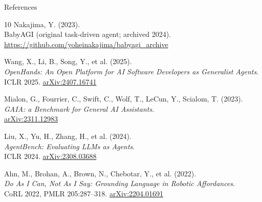 \begin{frame}[allowframebreaks]{References}
\begin{thebibliography}{10}
      Nakajima, Y. (2023). \\
      BabyAGI (original task-driven agent; archived 2024).\\
      \href{https://github.com/yoheinakajima/babyagi_archive}{https://github.com/yoheinakajima/babyagi\_archive}

      Wang, X., Li, B., Song, Y., et al. (2025). \\
      \emph{OpenHands: An Open Platform for AI Software Developers as Generalist Agents}.\\
      ICLR 2025. \href{https://arxiv.org/abs/2407.16741}{arXiv:2407.16741}

      Mialon, G., Fourrier, C., Swift, C., Wolf, T., LeCun, Y., Scialom, T. (2023). \\
      \emph{GAIA: a Benchmark for General AI Assistants}.\\
      \href{https://arxiv.org/abs/2311.12983}{arXiv:2311.12983}

      Liu, X., Yu, H., Zhang, H., et al. (2024). \\
      \emph{AgentBench: Evaluating LLMs as Agents}.\\
      ICLR 2024. \href{https://arxiv.org/abs/2308.03688}{arXiv:2308.03688}

      Ahn, M., Brohan, A., Brown, N., Chebotar, Y., et al. (2022). \\
      \emph{Do As I Can, Not As I Say: Grounding Language in Robotic Affordances}.\\
      CoRL 2022, PMLR 205:287--318. \href{https://arxiv.org/abs/2204.01691}{arXiv:2204.01691}
  \end{thebibliography}
\end{frame}
